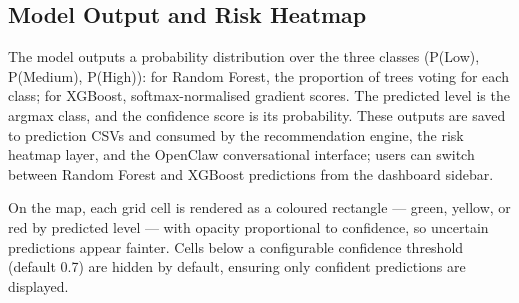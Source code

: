 \subsection{Model Output and Risk Heatmap}
\label{sec:risk_heatmap}

The model outputs a probability distribution over the three classes (P(Low), P(Medium), P(High)): for Random Forest, the proportion of trees voting for each class; for XGBoost, softmax-normalised gradient scores. The predicted level is the argmax class, and the confidence score is its probability. These outputs are saved to prediction CSVs and consumed by the recommendation engine, the risk heatmap layer, and the OpenClaw conversational interface; users can switch between Random Forest and XGBoost predictions from the dashboard sidebar.

On the map, each grid cell is rendered as a coloured rectangle --- green, yellow, or red by predicted level --- with opacity proportional to confidence, so uncertain predictions appear fainter. Cells below a configurable confidence threshold (default 0.7) are hidden by default, ensuring only confident predictions are displayed.
